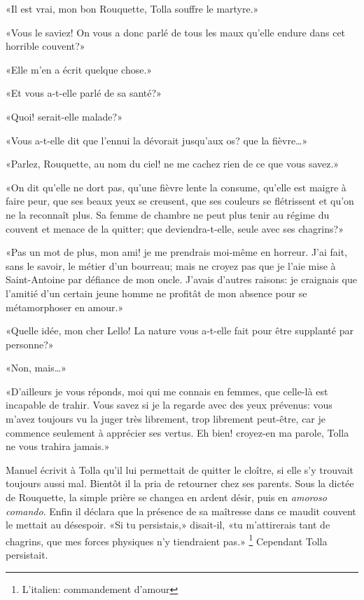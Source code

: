 «Il est vrai, mon bon Rouquette, Tolla souffre le martyre.»

«Vous le saviez! On vous a donc parlé de tous les maux qu'elle endure dans cet horrible couvent?»

«Elle m'en a écrit quelque chose.»

«Et vous a-t-elle parlé de sa santé?»

«Quoi! serait-elle malade?»

«Vous a-t-elle dit que l'ennui la dévorait jusqu'aux os? que la fièvre\ldots{}»

«Parlez, Rouquette, au nom du ciel! ne me cachez rien de ce que vous savez.»

«On dit qu'elle ne dort pas, qu'une fièvre lente la consume, qu'elle est maigre à faire peur, que ses beaux yeux se creusent, que ses couleurs se flétrissent et qu'on ne la reconnaît plus. Sa femme de chambre ne peut plus tenir au régime du couvent et menace de la quitter; que deviendra-t-elle, seule avec ses chagrins?»

«Pas un mot de plus, mon ami! je me prendrais moi-même en horreur. J'ai fait, sans le savoir, le métier d'un bourreau; mais ne croyez pas que je l'aie mise à Saint-Antoine par défiance de mon oncle. J'avais d'autres raisons: je craignais que l'amitié d'un certain jeune homme ne profitât de mon absence pour se métamorphoser en amour.»

«Quelle idée, mon cher Lello! La nature vous a-t-elle fait pour être supplanté par personne?»

«Non, mais\ldots{}»

«D'ailleurs je vous réponds, moi qui me connais en femmes, que celle-là est incapable de trahir. Vous savez si je la regarde avec des yeux prévenus: vous m'avez toujours vu la juger très librement, trop librement peut-être, car je commence seulement à apprécier ses vertus. Eh bien! croyez-en ma parole, Tolla ne vous trahira jamais.»

Manuel écrivit à Tolla qu'il lui permettait de quitter le cloître, si elle s'y trouvait toujours aussi mal. Bientôt il la pria de retourner chez ses parents. Sous la dictée de Rouquette, la simple prière se changea en ardent désir, puis en \emph{amoroso comando}. Enfin il déclara que la présence de sa maîtresse dans ce maudit couvent le mettait au désespoir. «Si tu persistais,» disait-il, «tu m'attirerais tant de chagrins, que mes forces physiques n'y tiendraient pas.»
\footnote{
L'italien: commandement d'amour
}
Cependant Tolla persistait.

